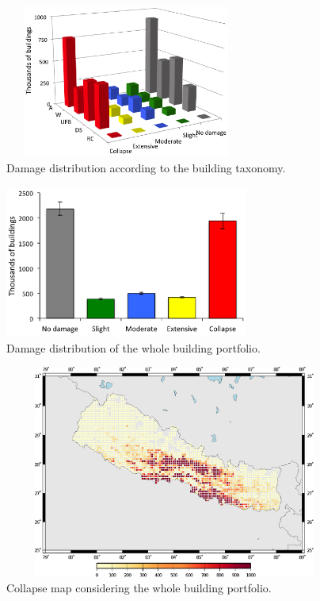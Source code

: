 \begin{figure}[ht]
\centering
\includegraphics[width=8cm,height=5cm]{./figures/risk/TaxonomyDisaggregation.eps}
\caption{Damage distribution according to the building taxonomy.}
\label{fig:TaxDis}
\end{figure} 

\begin{figure}[ht]
\centering
\includegraphics[width=8cm,height=5cm]{./figures/risk/TotalDis.eps}
\caption{Damage distribution of the whole building portfolio.}
\label{fig:TotalDis}
\end{figure} 

\begin{figure}[ht]
\centering
\includegraphics[width=12cm,height=7cm]{./figures/risk/CollapseMap.eps}
\caption{Collapse map considering the whole building portfolio.}
\label{fig:CollapseMap}
\end{figure} 
